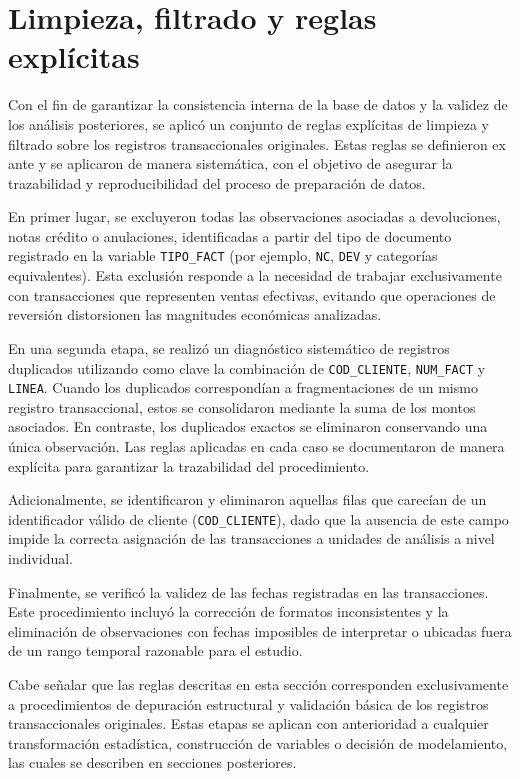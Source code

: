 

\section{Limpieza, filtrado y reglas explícitas}
    Con el fin de garantizar la consistencia interna de la base de datos y la validez de los análisis posteriores, se aplicó un conjunto de reglas explícitas de limpieza y filtrado sobre los registros transaccionales originales. Estas reglas se definieron ex ante y se aplicaron de manera sistemática, con el objetivo de asegurar la trazabilidad y reproducibilidad del proceso de preparación de datos.

    En primer lugar, se excluyeron todas las observaciones asociadas a devoluciones, notas crédito o anulaciones, identificadas a partir del tipo de documento registrado en la variable \texttt{TIPO\_FACT} (por ejemplo, \texttt{NC}, \texttt{DEV} y categorías equivalentes). Esta exclusión responde a la necesidad de trabajar exclusivamente con transacciones que representen ventas efectivas, evitando que operaciones de reversión distorsionen las magnitudes económicas analizadas.
    
    En una segunda etapa, se realizó un diagnóstico sistemático de registros duplicados utilizando como clave la combinación de \texttt{COD\_CLIENTE}, \texttt{NUM\_FACT} y \texttt{LINEA}. Cuando los duplicados correspondían a fragmentaciones de un mismo registro transaccional, estos se consolidaron mediante la suma de los montos asociados. En contraste, los duplicados exactos se eliminaron conservando una única observación. Las reglas aplicadas en cada caso se documentaron de manera explícita para garantizar la trazabilidad del procedimiento.
    
    Adicionalmente, se identificaron y eliminaron aquellas filas que carecían de un identificador válido de cliente (\texttt{COD\_CLIENTE}), dado que la ausencia de este campo impide la correcta asignación de las transacciones a unidades de análisis a nivel individual.
    
    Finalmente, se verificó la validez de las fechas registradas en las transacciones. Este procedimiento incluyó la corrección de formatos inconsistentes y la eliminación de observaciones con fechas imposibles de interpretar o ubicadas fuera de un rango temporal razonable para el estudio.
    
    Cabe señalar que las reglas descritas en esta sección corresponden exclusivamente a procedimientos de depuración estructural y validación básica de los registros transaccionales originales. Estas etapas se aplican con anterioridad a cualquier transformación estadística, construcción de variables o decisión de modelamiento, las cuales se describen en secciones posteriores.

